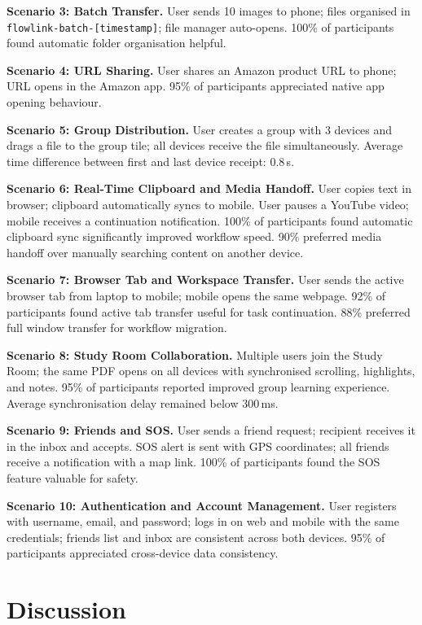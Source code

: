 \documentclass[conference]{IEEEtran}
\begin{document}
\textbf{Scenario 3: Batch Transfer.}
User sends 10 images to phone; files organised in \texttt{flowlink-batch-[timestamp]}; file manager auto-opens. 100\% of participants found automatic folder organisation helpful.

\textbf{Scenario 4: URL Sharing.}
User shares an Amazon product URL to phone; URL opens in the Amazon app. 95\% of participants appreciated native app opening behaviour.

\textbf{Scenario 5: Group Distribution.}
User creates a group with 3 devices and drags a file to the group tile; all devices receive the file simultaneously. Average time difference between first and last device receipt: 0.8\,s.

\textbf{Scenario 6: Real-Time Clipboard and Media Handoff.}
User copies text in browser; clipboard automatically syncs to mobile. User pauses a YouTube video; mobile receives a continuation notification. 100\% of participants found automatic clipboard sync significantly improved workflow speed. 90\% preferred media handoff over manually searching content on another device.

\textbf{Scenario 7: Browser Tab and Workspace Transfer.}
User sends the active browser tab from laptop to mobile; mobile opens the same webpage. 92\% of participants found active tab transfer useful for task continuation. 88\% preferred full window transfer for workflow migration.

\textbf{Scenario 8: Study Room Collaboration.}
Multiple users join the Study Room; the same PDF opens on all devices with synchronised scrolling, highlights, and notes. 95\% of participants reported improved group learning experience. Average synchronisation delay remained below 300\,ms.

\textbf{Scenario 9: Friends and SOS.}
User sends a friend request; recipient receives it in the inbox and accepts. SOS alert is sent with GPS coordinates; all friends receive a notification with a map link. 100\% of participants found the SOS feature valuable for safety.

\textbf{Scenario 10: Authentication and Account Management.}
User registers with username, email, and password; logs in on web and mobile with the same credentials; friends list and inbox are consistent across both devices. 95\% of participants appreciated cross-device data consistency.

\section{Discussion}
\end{document}

